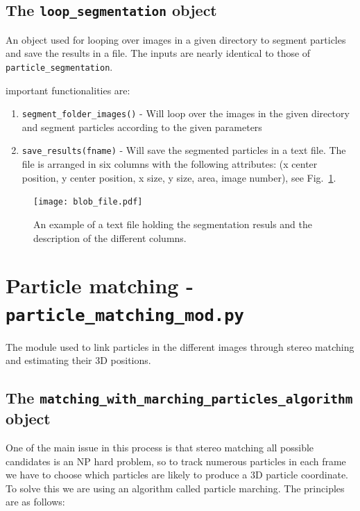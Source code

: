 \documentclass[10pt,a4paper]{article}
\begin{document}
\subsection{The \texttt{loop\_segmentation} object} 


An object used for looping over images in a given directory to segment particles and save the results in a file. The inputs are nearly identical to those of \texttt{particle\_segmentation}.


important functionalities are:
%
\begin{enumerate}
	\item \texttt{segment\_folder\_images()} - Will loop over the images in the given directory and segment particles according to the given parameters
	\item \texttt{save\_results(fname)} - Will save the segmented particles in a text file. The file is arranged in six columns with the following attributes: (x center position, y center position, x size, y size, area, image number), see Fig.~\ref{fig:blobfile}.
\end{enumerate}

\begin{figure}[!ht]
	\centering
	\texttt{[image: blob\_file.pdf]}
	\caption{An example of a text file holding the segmentation resuls and the description of the different columns. \label{fig:blobfile}} 
\end{figure}








\section{Particle matching - \texttt{particle\_matching\_mod.py}} \label{sec:matching}

The module used to link particles in the different images through stereo matching and estimating their 3D positions. 



\subsection{The \texttt{matching\_with\_marching\_particles\_algorithm} object}


One of the main issue in this process is that stereo matching all possible candidates is an NP hard problem, so to track numerous particles in each frame we have to choose which particles are likely to produce a 3D particle coordinate. To solve this we are using an algorithm called particle marching. The principles are as follows:
\end{document}
